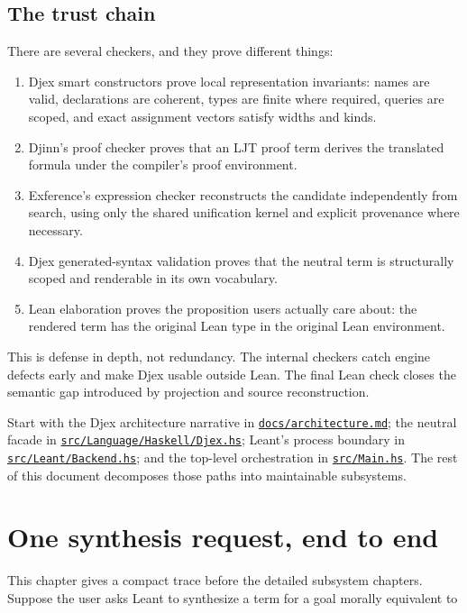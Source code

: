 \documentclass[10pt,letterpaper,oneside]{report}
\def\DjexBase{https://github.com/VladimirReshetnikov/Djex/blob/e454757d53ec057238c22fc6cd0d935b7d96b3dc/}
\def\LeantBase{https://github.com/VladimirReshetnikov/Leant/blob/ada69d884480b93e74ee4b3daf77be38702ee07d/}
\newcommand{\dpath}[1]{\href{\DjexBase#1}{\nolinkurl{#1}}}
\newcommand{\lpath}[1]{\href{\LeantBase#1}{\nolinkurl{#1}}}
\begin{document}
\section{The trust chain}

There are several checkers, and they prove different things:

\begin{enumerate}
  \item Djex smart constructors prove local representation invariants: names are valid, declarations are coherent, types are finite where required, queries are scoped, and exact assignment vectors satisfy widths and kinds.
  \item Djinn's proof checker proves that an LJT proof term derives the translated formula under the compiler's proof environment.
  \item Exference's expression checker reconstructs the candidate independently from search, using only the shared unification kernel and explicit provenance where necessary.
  \item Djex generated-syntax validation proves that the neutral term is structurally scoped and renderable in its own vocabulary.
  \item Lean elaboration proves the proposition users actually care about: the rendered term has the original Lean type in the original Lean environment.
\end{enumerate}

This is defense in depth, not redundancy. The internal checkers catch engine defects early and make Djex usable outside Lean. The final Lean check closes the semantic gap introduced by projection and source reconstruction.

\begin{sourcebox}
Start with the Djex architecture narrative in \dpath{docs/architecture.md}; the neutral facade in \dpath{src/Language/Haskell/Djex.hs}; Leant's process boundary in \lpath{src/Leant/Backend.hs}; and the top-level orchestration in \lpath{src/Main.hs}. The rest of this document decomposes those paths into maintainable subsystems.
\end{sourcebox}

\chapter{One synthesis request, end to end}\label{ch:end-to-end-overview}

This chapter gives a compact trace before the detailed subsystem chapters. Suppose the user asks Leant to synthesize a term for a goal morally equivalent to
\end{document}
